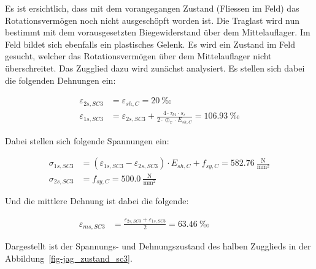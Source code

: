 \documentclass[
  11pt,
  letterpaper,
]{scrreprt}
\begin{document}
Es ist ersichtlich, dass mit dem vorangegangen Zustand (Fliessen im
Feld) das Rotationsvermögen noch nicht ausgeschöpft worden ist. Die
Traglast wird nun bestimmt mit dem vorausgesetzten Biegewiderstand über
dem Mittelauflager. Im Feld bildet sich ebenfalls ein plastisches
Gelenk. Es wird ein Zustand im Feld gesucht, welcher das
Rotationsvermögen über dem Mittelauflager nicht überschreitet. Das
Zugglied dazu wird zunächst analysiert. Es stellen sich dabei die
folgenden Dehnungen ein:

\[
\begin{aligned}
\varepsilon_{2 s , SC3}& = \varepsilon_{sh , C} = 20 \ \mathrm{‰} \\ 
\varepsilon_{1 s , SC3}& = \varepsilon_{2 s , SC3} + \frac{4 \cdot \tau_{b1} \cdot s_{r}}{2 \cdot \oslash_{x} \cdot E_{sh , C}} = 106.93 \ \mathrm{‰} \end{aligned}
\]

Dabei stellen sich folgende Spannungen ein:

\[
\begin{aligned}
\sigma_{1 s , SC3}& = \left(\varepsilon_{1 s , SC3} - \varepsilon_{2 s , SC3}\right) \cdot E_{sh , C} + f_{sy , C} = 582.76 \ \frac{\mathrm{N}}{\mathrm{mm}^{2}} \\ 
\sigma_{2 s , SC3}& = f_{sy , C} = 500.0 \ \frac{\mathrm{N}}{\mathrm{mm}^{2}} \end{aligned}
\]

Und die mittlere Dehnung ist dabei die folgende:

\[
\begin{aligned}
\varepsilon_{m s , SC3}& = \frac{\varepsilon_{2 s , SC3} + \varepsilon_{1 s , SC3}}{2} = 63.46 \ \mathrm{‰} \quad &  \quad &  
 \end{aligned}
\]

Dargestellt ist der Spannungs- und Dehnungszustand des halben Zugglieds
in der Abbildung~\ref{fig-jag_zustand_sc3}.
\end{document}
